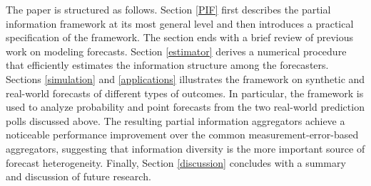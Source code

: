 \documentclass[11pt]{article}
\theoremstyle{definition}
\theoremstyle{definition}
\begin{document}
The paper is structured as follows. Section \ref{PIF} first describes the partial information framework at its most general level and then introduces a practical specification of the framework. 
The section ends with a brief review of previous work on modeling forecasts. Section \ref{estimator} derives a numerical procedure that efficiently estimates the information structure among the forecasters. Sections \ref{simulation} and \ref{applications} illustrates the framework on synthetic and real-world forecasts of different types of outcomes. In particular, the framework is used to analyze probability and point forecasts from the two real-world prediction polls discussed above. The resulting partial information aggregators achieve a noticeable performance improvement over the common measurement-error-based aggregators, suggesting that  information diversity is the more important  source of forecast heterogeneity. 
 Finally, Section \ref{discussion} concludes with a summary and discussion of
future research.



%
%

\end{document}
